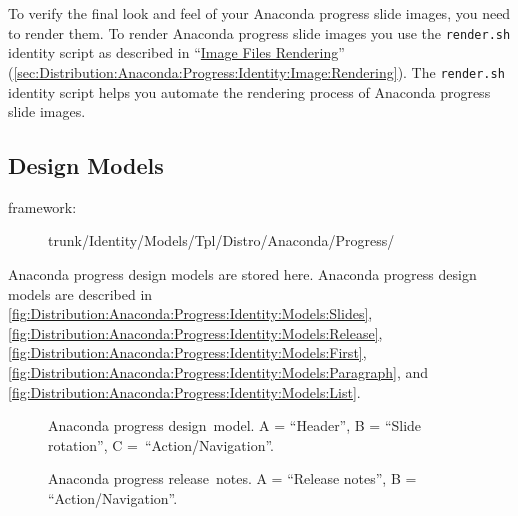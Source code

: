 To verify the final look and feel of your Anaconda progress slide
images, you need to render them. To render Anaconda progress slide
images you use the \texttt{render.sh} identity script as described in
``\hyperlink{sec:Distribution:Anaconda:Progress:Identity:Image:Rendering}{Image
Files Rendering}''
(\autoref{sec:Distribution:Anaconda:Progress:Identity:Image:Rendering}).
The \texttt{render.sh} identity script helps you automate the
rendering process of Anaconda progress slide images.

 \subsection{Design Models}
\hypertarget{sec:Distribution:Anaconda:Progress:Identity:Models}{}
      \label{sec:Distribution:Anaconda:Progress:Identity:Models}

\begin{description}
\item[framework:] trunk/Identity/Models/Tpl/Distro/Anaconda/Progress/
\end{description}

\noindent Anaconda progress design models are stored here.  Anaconda
progress design models are described in
\autoref{fig:Distribution:Anaconda:Progress:Identity:Models:Slides},
\autoref{fig:Distribution:Anaconda:Progress:Identity:Models:Release},
\autoref{fig:Distribution:Anaconda:Progress:Identity:Models:First},
\autoref{fig:Distribution:Anaconda:Progress:Identity:Models:Paragraph},
and \autoref{fig:Distribution:Anaconda:Progress:Identity:Models:List}.

\begin{figure}[!hbp]
\begin{center}
\end{center}
\caption[Anaconda progress design model]{Anaconda progress design\
model. A = ``Header'', B = ``Slide rotation'', C =\
``Action/Navigation''.%
   \label{fig:Distribution:Anaconda:Progress:Identity:Models:Slides}}
\end{figure}

\begin{figure}[!hbp]
\begin{center}
\end{center}
\caption[Anaconda progress release notes]{Anaconda progress release\
notes. A = ``Release notes'', B = ``Action/Navigation''.%
   \label{fig:Distribution:Anaconda:Progress:Identity:Models:Release}}
\end{figure}


